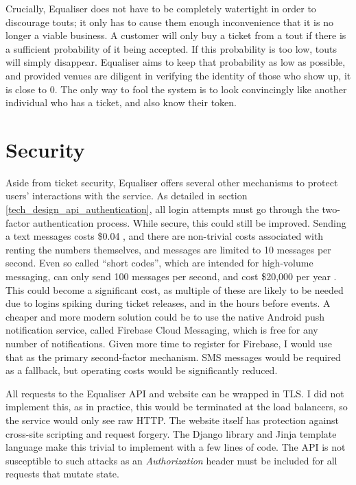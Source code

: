 \documentclass[12pt,a4paper]{bhamdissertation}
\begin{document}
Crucially, Equaliser does not have to be completely watertight in order to discourage touts; it only has to cause them enough inconvenience that it is no longer a viable business. A customer will only buy a ticket from a tout if there is a sufficient probability of it being accepted. If this probability is too low, touts will simply disappear. Equaliser aims to keep that probability as low as possible, and provided venues are diligent in verifying the identity of those who show up, it is close to 0. The only way to fool the system is to look convincingly like another individual who has a ticket, and also know their token.

\section{Security}

Aside from ticket security, Equaliser offers several other mechanisms to protect users' interactions with the service. As detailed in section \ref{tech_design_api_authentication}, all login attempts must go through the two-factor authentication process. While secure, this could still be improved. Sending a text messages costs \$0.04 \cite{T17}, and there are non-trivial costs associated with renting the numbers themselves, and messages are limited to 10 messages per second. Even so called ``short codes'', which are intended for high-volume messaging, can only send 100 messages per second, and cost \$20,000 per year \cite{T17}. This could become a significant cost, as multiple of these are likely to be needed due to logins spiking during ticket releases, and in the hours before events. A cheaper and more modern solution could be to use the native Android push notification service, called Firebase Cloud Messaging, which is free for any number of notifications. Given more time to register for Firebase, I would use that as the primary second-factor mechanism. SMS messages would be required as a fallback, but operating costs would be significantly reduced.

All requests to the Equaliser API and website can be wrapped in TLS. I did not implement this, as in practice, this would be terminated at the load balancers, so the service would only see raw HTTP. The website itself has protection against cross-site scripting and request forgery. The Django library and Jinja template language make this trivial to implement with a few lines of code. The API is not susceptible to such attacks as an \textit{Authorization} header must be included for all requests that mutate state.
\end{document}
